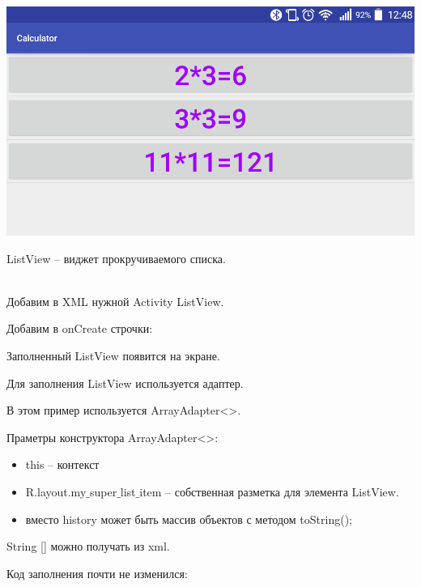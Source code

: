 
\\

    \includegraphics[scale=0.3]{07-list-views/Screenshot.png}

    ListView -- виджет прокручиваемого списка.
    

\\

    Добавим в XML нужной Activity ListView. 

    
    Добавим в onCreate строчки:
    

    Заполненный ListView появится на экране.
    
    Для заполнения ListView используется адаптер. 
    
    В этом пример используется ArrayAdapter<>.
    
    Праметры конструктора ArrayAdapter<>:
    \begin{itemize}
        \item this -- контекст
        \item R.layout.my$\_$super$\_$list$\_$item -- собственная разметка для элемента ListView.
        \item вместо history может быть массив объектов с методом toString();
    \end{itemize}

    
    String [] можно получать из xml.
    
    
    Код заполнения почти не изменился:
    
